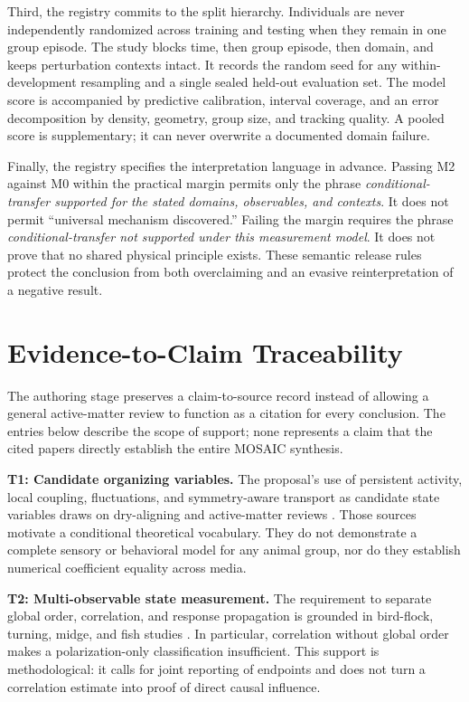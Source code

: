 \documentclass[conference]{../../../../Conference-LaTeX-template_10-17-19/IEEEtran}
\begin{document}
Third, the registry commits to the split hierarchy. Individuals are never independently randomized across training and testing when they remain in one group episode. The study blocks time, then group episode, then domain, and keeps perturbation contexts intact. It records the random seed for any within-development resampling and a single sealed held-out evaluation set. The model score is accompanied by predictive calibration, interval coverage, and an error decomposition by density, geometry, group size, and tracking quality. A pooled score is supplementary; it can never overwrite a documented domain failure.

Finally, the registry specifies the interpretation language in advance. Passing M2 against M0 within the practical margin permits only the phrase \emph{conditional-transfer supported for the stated domains, observables, and contexts}. It does not permit ``universal mechanism discovered.'' Failing the margin requires the phrase \emph{conditional-transfer not supported under this measurement model}. It does not prove that no shared physical principle exists. These semantic release rules protect the conclusion from both overclaiming and an evasive reinterpretation of a negative result.

\section{Evidence-to-Claim Traceability}
The authoring stage preserves a claim-to-source record instead of allowing a general active-matter review to function as a citation for every conclusion. The entries below describe the scope of support; none represents a claim that the cited papers directly establish the entire MOSAIC synthesis.

\noindent\textbf{T1: Candidate organizing variables.} The proposal's use of persistent activity, local coupling, fluctuations, and symmetry-aware transport as candidate state variables draws on dry-aligning and active-matter reviews \cite{chate,ramaswamy,ginelli,gompper}. Those sources motivate a conditional theoretical vocabulary. They do not demonstrate a complete sensory or behavioral model for any animal group, nor do they establish numerical coefficient equality across media.

\noindent\textbf{T2: Multi-observable state measurement.} The requirement to separate global order, correlation, and response propagation is grounded in bird-flock, turning, midge, and fish studies \cite{cavagnaBird,cavagnaTurn,attanasi,katz}. In particular, correlation without global order makes a polarization-only classification insufficient. This support is methodological: it calls for joint reporting of endpoints and does not turn a correlation estimate into proof of direct causal influence.
\end{document}
